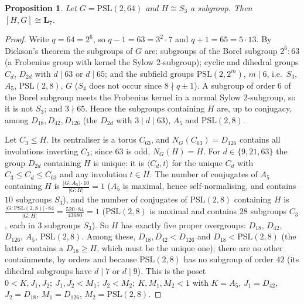 \documentclass[11pt]{article}
\newtheorem{proposition}[theorem]{Proposition}
\theoremstyle{remark}
\newcommand{\LL}{\mathbf{L}_7}
\begin{document}
\begin{proposition}\label{prop:hand}
Let $G=\mathrm{PSL}(2,64)$ and $H\cong S_3$ a subgroup. Then $[H,G]\cong\LL$.
\end{proposition}
\begin{proof}
Write $q=64=2^6$, so $q-1=63=3^2\cdot 7$ and $q+1=65=5\cdot 13$. By Dickson's theorem the
subgroups of $G$ are: subgroups of the Borel subgroup $2^6{:}63$ (a Frobenius group with
kernel the Sylow $2$-subgroup); cyclic and dihedral groups $C_d$, $D_{2d}$ with $d\mid 63$ or
$d\mid 65$; and the subfield groups $\mathrm{PSL}(2,2^m)$, $m\mid 6$, i.e.\ $S_3$, $A_5$,
$\mathrm{PSL}(2,8)$, $G$ ($S_4$ does not occur since $8\nmid q\pm1$). A subgroup of order $6$
of the Borel subgroup meets the Frobenius kernel in a normal Sylow $2$-subgroup, so it is not
$S_3$; and $3\nmid 65$. Hence the subgroups containing $H$ are, up to conjugacy, among
$D_{18}, D_{42}, D_{126}$ (the $D_{2d}$ with $3\mid d\mid 63$), $A_5$ and $\mathrm{PSL}(2,8)$.

Let $C_3\le H$. Its centraliser is a torus $C_{63}$, and $N_G(C_{63})=D_{126}$ contains all
involutions inverting $C_3$; since $63$ is odd, $N_G(H)=H$. For $d\in\{9,21,63\}$ the group
$D_{2d}$ containing $H$ is unique: it is $\langle C_d,t\rangle$ for the unique $C_d$ with
$C_3\le C_d\le C_{63}$ and any involution $t\in H$. The number of conjugates of $A_5$
containing $H$ is $\frac{|G:A_5|\cdot 10}{|G:H|}=1$ ($A_5$ is maximal, hence self-normalising,
and contains $10$ subgroups $S_3$), and the number of conjugates of $\mathrm{PSL}(2,8)$
containing $H$ is $\frac{|G:\mathrm{PSL}(2,8)|\cdot 84}{|G:H|}=\frac{520\cdot 84}{43680}=1$
($\mathrm{PSL}(2,8)$ is maximal and contains $28$ subgroups $C_3$, each in $3$ subgroups $S_3$).
So $H$ has exactly five proper overgroups: $D_{18}$, $D_{42}$, $D_{126}$, $A_5$,
$\mathrm{PSL}(2,8)$. Among these, $D_{18},D_{42}<D_{126}$ and $D_{18}<\mathrm{PSL}(2,8)$
(the latter contains a $D_{18}\ge H$, which must be the unique one); there are no other
containments, by orders and because $\mathrm{PSL}(2,8)$ has no subgroup of order $42$ (its
dihedral subgroups have $d\mid 7$ or $d\mid 9$). This is the poset
$0<K,J_1,J_2;\ J_1,J_2<M_1;\ J_2<M_2;\ K,M_1,M_2<1$ with
$K=A_5$, $J_1=D_{42}$, $J_2=D_{18}$, $M_1=D_{126}$, $M_2=\mathrm{PSL}(2,8)$.
\end{proof}
\end{document}
